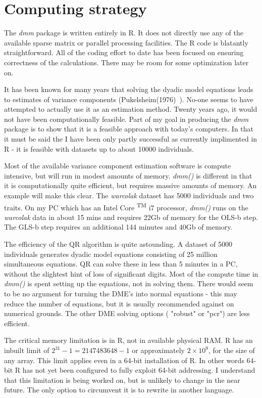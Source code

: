 \documentclass[titlepage]{article}  %
\begin{document}
\clearpage
\section{Computing strategy}
The {\em dmm} package is written entirely in R. It does not directly use any of the available sparse matrix or parallel processing facilities. The R code is blatantly straightforward. All of the coding effort to date has been focused on ensuring correctness of the calculations. There may be room for some optimization later on.

It has been known for many years that solving the dyadic model equations leads to estimates of variance components (Pukelsheim(1976)~\cite{puke:76}).  No-one seems to have attempted to actually use it as an estimation method. Twenty years ago, it would not have been computationally feasible. Part of my goal in producing the {\em dmm} package is to show that it is a feasible approach with today's computers. In that it must be said the I have been only partly successful as currently implimented in R - it is feasible with datasets up to about 10000 individuals.

Most of the available variance component estimation software is compute intensive, but will run in modest amounts of memory. {\em dmm()} is different in that it is computationally quite efficient, but requires massive amounts of memory. An example will make this clear. The {\em warcolak} dataset has 5000 individuals and two traits. On my PC which has an Intel \textregistered \hspace{1pt} Core \textsuperscript{TM} i7 processor, {\em dmm()} runs on the {\em warcolak} data in about 15 mins and requires 22Gb of memory for the OLS-b step. The GLS-b step requires an additional 144 minutes and 40Gb of memory. 

The efficiency of the QR algorithm is quite astounding. A dataset of 5000 individuals generates dyadic model equations consisting of 25 million simultaneous equations. QR can solve these in less than 5 minutes in a PC, without the slightest hint of loss of significant digits. Most of the compute time in {\em dmm()} is spent setting up the equations, not in solving them. There would seem to be no argument for turning the DME's into normal equations - this may reduce the number of equations, but it is usually recommended against on numerical grounds. The other DME solving options ( "robust" or "pcr") are less efficient.

The critical memory limitation is in R, not in available physical RAM. R has an inbuilt limit of $2^{31} - 1 = 2147483648 - 1$ or approximately $2 \times 10^{9}$, for the size of any array. This limit applies even in a 64-bit installation of R. In other words 64-bit R has not yet been configured to fully exploit 64-bit addressing. I understand that this limitation is being worked on, but is unlikely to change in the near future. The only option to circumvent it is to rewrite in another language.
\end{document}
